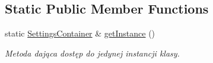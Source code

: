 \subsection*{Static Public Member Functions}
\begin{DoxyCompactItemize}
\item 
\mbox{\label{class_settings_container_a831ab236683112c5e052018399421102}} 
static \mbox{\hyperlink{class_settings_container}{Settings\+Container}} \& \mbox{\hyperlink{class_settings_container_a831ab236683112c5e052018399421102}{get\+Instance}} ()
\begin{DoxyCompactList}\small\item\em Metoda dająca dostęp do jedynej instancji klasy. \end{DoxyCompactList}\end{DoxyCompactItemize}
